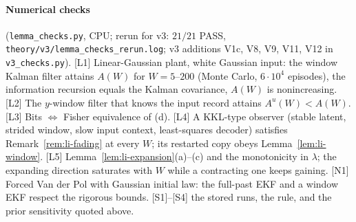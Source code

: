 {\sloppy \paragraph{Numerical checks} (\texttt{lemma\_checks.py}, CPU; rerun for v3: $21/21$ PASS,
\texttt{theory/v3/lemma\_checks\_rerun.log}; v3 additions V1c, V8, V9, V11, V12 in \texttt{v3\_checks.py}). [L1] Linear-Gaussian plant, white Gaussian input: the
window Kalman filter attains $A(W)$ for $W=5$--$200$ (Monte Carlo, $6\cdot10^4$ episodes), the information recursion
equals the Kalman covariance, $A(W)$ is nonincreasing. [L2] The $y$-window filter that knows the input record attains
$A^u(W)<A(W)$. [L3] Bits $\Leftrightarrow$ Fisher equivalence of (d). [L4] A KKL-type observer (stable latent,
strided window, slow input context, least-squares decoder) satisfies Remark~\ref{rem:li-fading} at every $W$;
its restarted copy obeys Lemma~\ref{lem:li-window}. [L5] Lemma~\ref{lem:li-expansion}(a)--(c) and the monotonicity in
$\lambda$; the expanding direction saturates with $W$ while a contracting one keeps gaining. [N1] Forced Van der
Pol with Gaussian initial law: the full-past EKF and a window EKF respect the rigorous bounds. [S1]--[S4] the stored
runs, the rule, and the prior sensitivity quoted above.\par}

